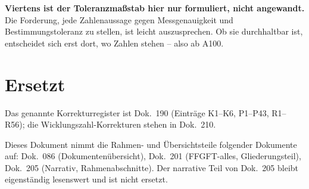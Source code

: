 \textbf{Viertens ist der Toleranzmaßstab hier nur formuliert, nicht
angewandt.} Die Forderung, jede Zahlenaussage gegen Messgenauigkeit und
Bestimmungstoleranz zu stellen, ist leicht auszusprechen. Ob sie durchhaltbar
ist, entscheidet sich erst dort, wo Zahlen stehen -- also ab A100.

\section{Ersetzt}

Das genannte Korrekturregister ist Dok.~190 (Einträge K1--K6, P1--P43, R1--R56); die Wicklungszahl-Korrekturen stehen in Dok.~210.

Dieses Dokument nimmt die Rahmen- und Übersichtsteile folgender Dokumente auf:
Dok.~086 (Dokumentenübersicht), Dok.~201 (FFGFT-alles, Gliederungsteil),
Dok.~205 (Narrativ, Rahmenabschnitte). Der narrative Teil von Dok.~205 bleibt
eigenständig lesenswert und ist nicht ersetzt.
